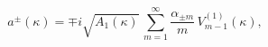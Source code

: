 \begin{equation}
a^{\pm}(\kappa)=\mp i\sqrt{A_1(\kappa)}\,\sum_{m=1}^{\infty}
\frac{\alpha_{\pm m}}{m}\,V_{m-1}^{(1)}(\kappa),
\label{517}
\end{equation}

